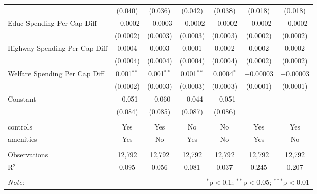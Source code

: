 \begin{table}[!htbp]
\begin{tabular}{@{\extracolsep{5pt}}lcccccc}
  & (0.040) & (0.036) & (0.042) & (0.038) & (0.018) & (0.018) \\ 
  Educ Spending Per Cap Diff & $-$0.0002 & $-$0.0003 & $-$0.0002 & $-$0.0002 & $-$0.0002 & $-$0.0002 \\ 
  & (0.0002) & (0.0003) & (0.0003) & (0.0003) & (0.0002) & (0.0002) \\ 
  Highway Spending Per Cap Diff & 0.0004 & 0.0003 & 0.0001 & 0.0002 & 0.0002 & 0.0002 \\ 
  & (0.0004) & (0.0004) & (0.0004) & (0.0004) & (0.0002) & (0.0002) \\ 
  Welfare Spending Per Cap Diff & 0.001$^{**}$ & 0.001$^{**}$ & 0.001$^{**}$ & 0.0004$^{*}$ & $-$0.00003 & $-$0.00003 \\ 
  & (0.0002) & (0.0003) & (0.0003) & (0.0003) & (0.0001) & (0.0001) \\ 
  Constant & $-$0.051 & $-$0.060 & $-$0.044 & $-$0.051 &  &  \\ 
  & (0.084) & (0.085) & (0.087) & (0.086) &  &  \\ 
 \hline \\[-1.8ex] 
controls & Yes & Yes & No & No & Yes & Yes \\ 
amenities & Yes & No & Yes & No & Yes & No \\ 
\hline \\[-1.8ex] 
Observations & 12,792 & 12,792 & 12,792 & 12,792 & 12,792 & 12,792 \\ 
R$^{2}$ & 0.095 & 0.056 & 0.081 & 0.037 & 0.245 & 0.207 \\ 
\hline 
\hline \\[-1.8ex] 
\textit{Note:}  & \multicolumn{6}{r}{$^{*}$p$<$0.1; $^{**}$p$<$0.05; $^{***}$p$<$0.01} \\ 
\end{tabular} 
\end{table} 
